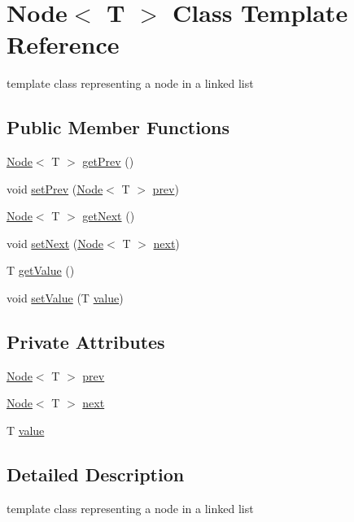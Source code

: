 \hypertarget{classNode}{}\section{Node$<$ T $>$ Class Template Reference}
\label{classNode}


template class representing a node in a linked list  


\subsection*{Public Member Functions}
\begin{DoxyCompactItemize}
\item 
\hyperlink{classNode}{Node}$<$ T $>$ \hyperlink{classNode_a8820838ccedbe0501158aed75feba1a3}{get\+Prev} ()
\item 
void \hyperlink{classNode_ae629180d7027b785760c20f894fe765a}{set\+Prev} (\hyperlink{classNode}{Node}$<$ T $>$ \hyperlink{classNode_ad309e9a49a7df9d1b00be69b4292ddeb}{prev})
\item 
\hyperlink{classNode}{Node}$<$ T $>$ \hyperlink{classNode_a2ec63a299666383d35bdde247fb7fb67}{get\+Next} ()
\item 
void \hyperlink{classNode_a94f8b143101fb5b7dcf964ed5998e640}{set\+Next} (\hyperlink{classNode}{Node}$<$ T $>$ \hyperlink{classNode_a2b7406e38faf070c2622a17670863f1e}{next})
\item 
T \hyperlink{classNode_a8f0d4417f8e6d361a39f351e8fe1a730}{get\+Value} ()
\item 
void \hyperlink{classNode_ac7eacfef1bec39960d3f26f390dc4b83}{set\+Value} (T \hyperlink{classNode_a34f6f13762391af4b29df43a42d675fd}{value})
\end{DoxyCompactItemize}
\subsection*{Private Attributes}
\begin{DoxyCompactItemize}
\item 
\hyperlink{classNode}{Node}$<$ T $>$ \hyperlink{classNode_ad309e9a49a7df9d1b00be69b4292ddeb}{prev}
\item 
\hyperlink{classNode}{Node}$<$ T $>$ \hyperlink{classNode_a2b7406e38faf070c2622a17670863f1e}{next}
\item 
T \hyperlink{classNode_a34f6f13762391af4b29df43a42d675fd}{value}
\end{DoxyCompactItemize}


\subsection{Detailed Description}
template class representing a node in a linked list 



